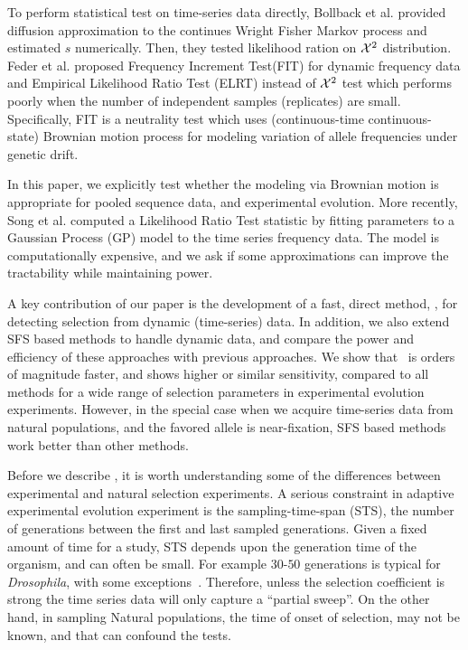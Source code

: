 \documentclass[11pt]{article}
\def\comale{\text{{\sc Comale}}}
\begin{document}
To perform statistical test on time-series data directly, Bollback et
al. \cite{bollback2008estimation} provided diffusion approximation to
the continues Wright Fisher Markov process and estimated $s$
numerically. Then, they tested likelihood ration on ${\cal X}^2$
distribution. Feder et al. \cite{feder2014Identifying} proposed
Frequency Increment Test(FIT) for dynamic frequency data and Empirical
Likelihood Ratio Test (ELRT) instead of ${\cal X}^2$ test which performs
poorly when the number of independent samples (replicates) are small.
Specifically, FIT is a neutrality test which uses (continuous-time
continuous-state) Brownian motion process for modeling variation of
allele frequencies under genetic drift. 
 In this paper, we explicitly test whether the modeling via
Brownian motion is appropriate for pooled sequence data, and
experimental evolution.  More recently, Song et al.
\cite{Terhorst2015Multi} computed a Likelihood Ratio Test statistic by
fitting parameters to a Gaussian Process (GP) model to the time series
frequency data. The model is computationally expensive, and we ask if
some approximations can improve the tractability while maintaining
power.

A key contribution of our paper is the development of a fast, direct
method, \comale, for detecting selection from dynamic (time-series)
data. In addition, we also extend SFS based methods to handle dynamic
data, and compare the power and efficiency of these approaches with
previous approaches. We show that \comale\ is orders of magnitude
faster, and shows higher or similar sensitivity, compared to all
methods for a wide range of selection parameters in experimental
evolution experiments.  However, in the special case when we acquire
time-series data from natural populations, and the favored allele is
near-fixation, SFS based methods work better than other methods.

Before we describe \comale, it is worth understanding some of the
differences between experimental and natural selection experiments. A
serious constraint in adaptive experimental evolution experiment is
the sampling-time-span (STS), the number of generations between the
first and last sampled generations. Given a fixed amount of time for a
study, STS depends upon the generation time of the organism, and can
often be small. For example $30$-$50$ generations is typical for
\emph{Drosophila}, with some exceptions~\cite{zhou2011experimental}. Therefore, unless
the selection coefficient is strong the time series data will only
capture a ``partial sweep''. On the other hand, in sampling Natural
populations, the time of onset of selection, may not be known, and
that can confound the tests.
\end{document}
